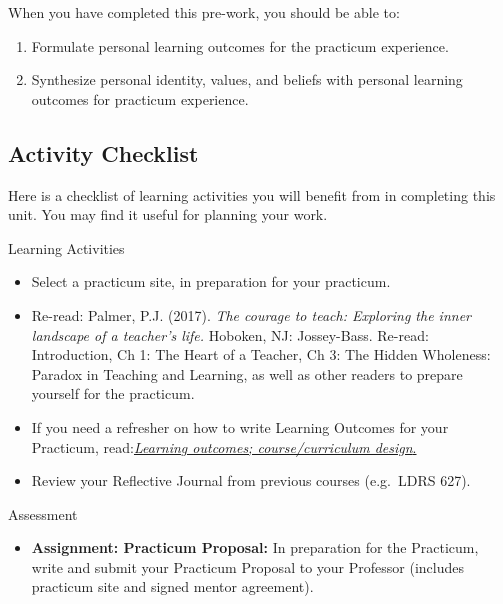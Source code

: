 \documentclass[
]{book}
\providecommand{\tightlist}{%
  \setlength{\itemsep}{0pt}\setlength{\parskip}{0pt}}
\begin{document}
When you have completed this pre-work, you should be able to:

\begin{enumerate}
\def\labelenumi{\arabic{enumi}.}
\tightlist
\item
  Formulate personal learning outcomes for the practicum experience.\\
\item
  Synthesize personal identity, values, and beliefs with personal learning outcomes for practicum experience.
\end{enumerate}

\hypertarget{activity-checklist}{%
\subsection*{Activity Checklist}\label{activity-checklist}}

Here is a checklist of learning activities you will benefit from in completing this unit. You may find it useful for planning your work.

\begin{reflect}
{Learning Activities }

\begin{itemize}
\tightlist
\item
  Select a practicum site, in preparation for your practicum.\\
\item
  Re-read: Palmer, P.J. (2017). \emph{The courage to teach: Exploring the inner landscape of a teacher's life.} Hoboken, NJ: Jossey-Bass. Re-read: Introduction, Ch 1: The Heart of a Teacher, Ch 3: The Hidden Wholeness: Paradox in Teaching and Learning, as well as other readers to prepare yourself for the practicum.\\
\item
  If you need a refresher on how to write Learning Outcomes for your Practicum, read:\href{https://teaching.uwo.ca/curriculum/coursedesign/learning-outcomes.html}{\emph{Learning outcomes; course/curriculum design}.}
\item
  Review your Reflective Journal from previous courses (e.g.~LDRS 627).
\end{itemize}
\end{reflect}

\begin{assessment}
{Assessment}

\begin{itemize}
\tightlist
\item
  \textbf{Assignment: Practicum Proposal:} In preparation for the Practicum, write and submit your Practicum Proposal to your Professor (includes practicum site and signed mentor agreement).
\end{itemize}
\end{assessment}
\end{document}
